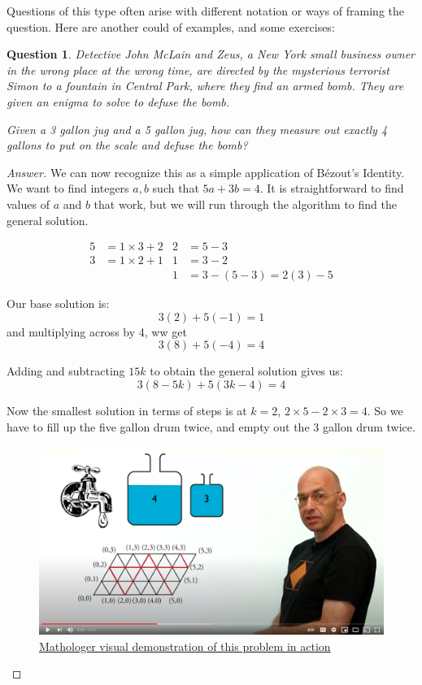 \documentclass{article}
\newtheorem{question}{Question}
\begin{document}
Questions of this type often arise with different notation or ways of framing the question. Here are
another could of examples, and some exercises:

\begin{question}
	Detective John McLain and Zeus, a New York small business owner in the wrong place at the wrong
	time, are directed by the mysterious terrorist Simon to a fountain in Central Park, where they
	find an armed bomb. They are given an enigma to solve to defuse the bomb.

	Given a 3 gallon jug and a 5 gallon jug, how can they measure out exactly 4 gallons to put
	on the scale and defuse the bomb?
\end{question}

\begin{proof}[Answer]
	We can now recognize this as a simple application of B\'ezout's Identity. We want to find integers
	$a, b$ such that $5a + 3b = 4$. It is straightforward to find values of $a$ and $b$ that work,
	but we will run through the algorithm to find the general solution.

	\begin{align*}
		5 &= 1 \times 3 + 2 & 2 &= 5 - 3  \\
		3 &= 1 \times 2 + 1 & 1 &= 3 - 2 \\
		& & 1 &= 3 - (5 - 3) = 2(3) - 5
	\end{align*}

	Our base solution is:
	\[ 3(2) + 5(-1) = 1\]
	and multiplying across by 4, ww get 
	\[ 3(8) + 5(-4) = 4\]

	Adding and subtracting $15k$ to obtain the general solution gives us:
	\[ 3(8-5k) + 5(3k-4) = 4\]

	Now the smallest solution in terms of steps is at $k=2$, $2\times 5 - 2\times 3 = 4$. So we have
	to fill up the five gallon drum twice, and empty out the 3 gallon drum twice.

	\begin{figure}[ht!]
	\includegraphics{mathologer.png}
		\caption{\href{https://www.youtube.com/watch?v=0Oef3MHYEC0}{Mathologer
		visual demonstration of this problem in action}}
	\end{figure}


\end{proof}
\end{document}
